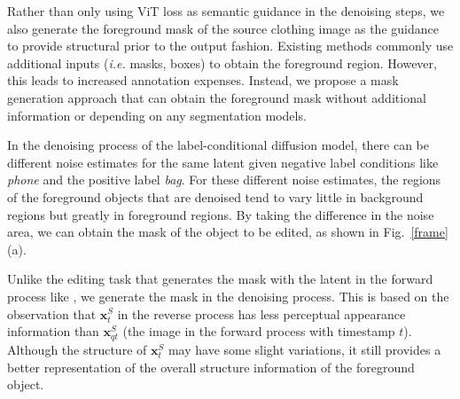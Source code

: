 Rather than only using ViT loss as semantic guidance in the denoising steps, we also generate the foreground mask of the source clothing image as the guidance to provide structural prior to the output fashion. 
Existing methods commonly use additional inputs (\textit{i.e.} masks, boxes) to obtain the foreground region. However, this leads to increased annotation expenses. Instead, we propose a mask generation approach that can obtain the foreground mask without additional information or depending on any segmentation models.

In the denoising process of the label-conditional diffusion model, there can be different noise estimates for the same latent given negative label conditions like \textit{phone} and the positive label \textit{bag}. For these different noise estimates, the regions of the foreground objects that are denoised tend to vary little in background regions but greatly in foreground regions. By taking the difference in the noise area, we can obtain the mask of the object to be edited, as shown in Fig.~\ref{frame}(a).

Unlike the editing task that generates the mask with the latent in the forward process like \cite{couairon2022diffedit}, we generate the mask in the denoising process.
This is based on the observation that $\mathbf{x}^{S}_t$ in the reverse process has less perceptual appearance information than $\mathbf{x}^{S}_{qt}$ (the image in the forward process with timestamp $t$). 
Although the structure of $\mathbf{x}^{S}_t$ may have some slight variations, it still provides a better representation of the overall structure information of the foreground object.

